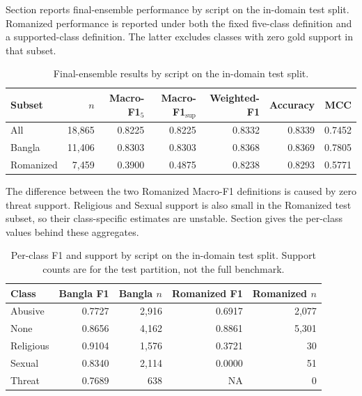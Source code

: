 \documentclass[11pt,a4paper]{article}
\def\Cref#1{Section}%
\def\emph#1{#1}%
\begin{document}
\Cref{tab:script-results} reports final-ensemble performance by script on the in-domain test split. Romanized performance is reported under both the fixed five-class definition and a supported-class definition. The latter excludes classes with zero gold support in that subset.

\begin{table}[!htbp]
\centering
\caption{Final-ensemble results by script on the in-domain test split.}
\label{tab:script-results}
\small
\begin{tabular}{@{}lrrrrrr@{}}
\toprule
\textbf{Subset} & \textbf{$n$} & \textbf{Macro-F1$_5$} & \textbf{Macro-F1$_{\mathrm{sup}}$} & \textbf{Weighted-F1} & \textbf{Accuracy} & \textbf{MCC} \\
\midrule
All & 18{,}865 & 0.8225 & 0.8225 & 0.8332 & 0.8339 & 0.7452 \\
Bangla & 11{,}406 & 0.8303 & 0.8303 & 0.8368 & 0.8369 & 0.7805 \\
Romanized & 7{,}459 & 0.3900 & 0.4875 & 0.8238 & 0.8293 & 0.5771 \\
\bottomrule
\end{tabular}
\end{table}

The difference between the two Romanized Macro-F1 definitions is caused by zero \emph{threat} support. Religious and Sexual support is also small in the Romanized test subset, so their class-specific estimates are unstable. \Cref{tab:script-perclass} gives the per-class values behind these aggregates.

\begin{table}[!htbp]
\centering
\caption{Per-class F1 and support by script on the in-domain test split. Support counts are for the test partition, not the full benchmark.}
\label{tab:script-perclass}
\small
\begin{tabular}{@{}lrrrr@{}}
\toprule
\textbf{Class} & \textbf{Bangla F1} & \textbf{Bangla $n$} & \textbf{Romanized F1} & \textbf{Romanized $n$} \\
\midrule
Abusive & 0.7727 & 2{,}916 & 0.6917 & 2{,}077 \\
None & 0.8656 & 4{,}162 & 0.8861 & 5{,}301 \\
Religious & 0.9104 & 1{,}576 & 0.3721 & 30 \\
Sexual & 0.8340 & 2{,}114 & 0.0000 & 51 \\
Threat & 0.7689 & 638 & NA & 0 \\
\bottomrule
\end{tabular}
\end{table}
\end{document}
